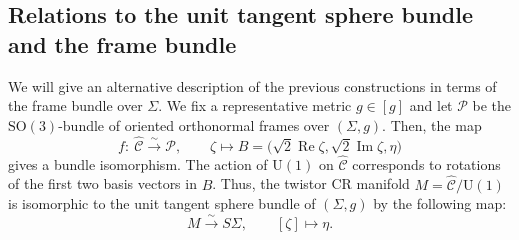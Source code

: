 \documentclass[11pt]{article}
\numberwithin{equation}{section}
\newcommand{\wh}{\widehat}
\numberwithin{equation}{section}
\begin{document}
\subsection{Relations to the unit tangent sphere bundle and the frame bundle}\label{sphere-bundle}
We will give an alternative description of the previous constructions in terms of the frame bundle over $\Sigma$.
We fix a representative metric $g\in[g]$ and let
$\mathcal{P}$ be the $\mathrm{SO}(3)$-bundle of oriented orthonormal frames over $(\Sigma, g)$. Then, the map
\begin{equation}\label{isom-C-hat}
f\colon\ \wh{\mathcal{C}}\overset{\sim}{\longrightarrow} \mathcal{P}, \qquad
\zeta \longmapsto B=\bigl(\sqrt{2}\operatorname{Re}\zeta, \sqrt{2}\operatorname{Im}\zeta, \eta\bigr)
\end{equation}
gives a bundle isomorphism. The action of $\mathrm{U}(1)$ on $\wh{\mathcal{C}}$ corresponds to rotations of the first two basis vectors in $B$. Thus, the twistor CR manifold $M= \wh{\mathcal{C}}/\mathrm{U}(1)$ is isomorphic to the unit tangent sphere bundle of $(\Sigma, g)$ by the following map:
\begin{equation}\label{M-isom}
M \overset{\sim}{\longrightarrow} S\Sigma, \qquad
[\zeta]\longmapsto \eta.
\end{equation}
\end{document}
